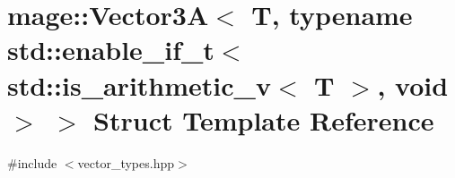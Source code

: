 \hypertarget{structmage_1_1_vector3_a_3_01_t_00_01typename_01std_1_1enable__if__t_3_01std_1_1is__arithmetic__7070ab83646a86866d1e3c9d7eeea37a}{}\section{mage\+:\+:Vector3A$<$ T, typename std\+:\+:enable\+\_\+if\+\_\+t$<$ std\+:\+:is\+\_\+arithmetic\+\_\+v$<$ T $>$, void $>$ $>$ Struct Template Reference}
\label{structmage_1_1_vector3_a_3_01_t_00_01typename_01std_1_1enable__if__t_3_01std_1_1is__arithmetic__7070ab83646a86866d1e3c9d7eeea37a}


{\ttfamily \#include $<$vector\+\_\+types.\+hpp$>$}

